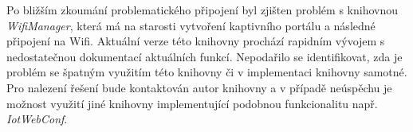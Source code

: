 Po bližším zkoumání problematického připojení byl zjišten problém s knihovnou \textit{WifiManager}, která má na starosti vytvoření kaptivního portálu a následné připojení na Wifi. Aktuální verze této knihovny prochází rapidním vývojem s nedostatečnou dokumentací aktuálních funkcí. Nepodařilo se identifikovat, zda je problém se špatným využitím této knihovny či v implementaci knihovny samotné. Pro nalezení řešení bude kontaktován autor knihovny a v případě neúspěchu je možnost využití jiné knihovny implementující podobnou funkcionalitu např. \textit{IotWebConf}.